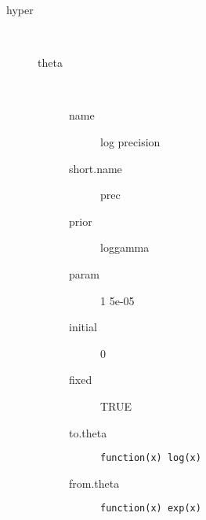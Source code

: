 \begin{description}
	\item[hyper]\ 
	 \begin{description}
	 	\item[theta]\ 
	 	 \begin{description}
	 	 	\item[name] log precision
	 	 	\item[short.name] prec
	 	 	\item[prior] loggamma
	 	 	\item[param] 1 5e-05
	 	 	\item[initial] 0
	 	 	\item[fixed] TRUE
	 	 	\item[to.theta] \verb|function(x) log(x)|
	 	 	\item[from.theta] \verb|function(x) exp(x)|
	 	 \end{description}
	 \end{description}
\end{description}
